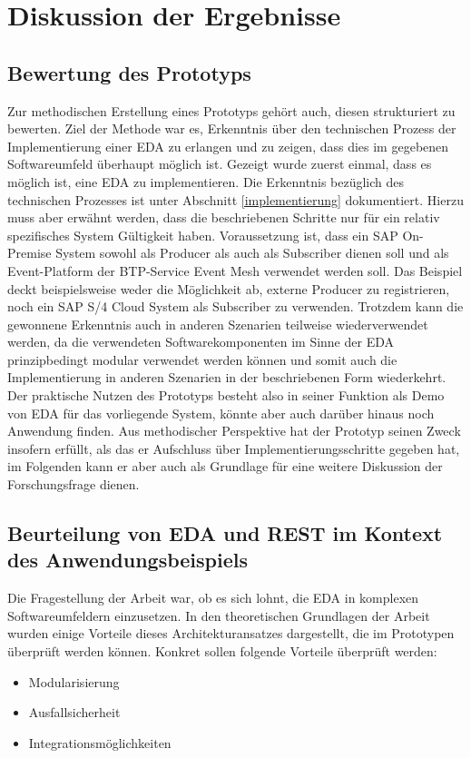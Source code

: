 \section{Diskussion der Ergebnisse}
\subsection{Bewertung des Prototyps}
Zur methodischen Erstellung eines Prototyps gehört auch, diesen strukturiert zu bewerten. Ziel der Methode war es, Erkenntnis über den technischen Prozess der Implementierung einer \ac{EDA} zu erlangen und zu zeigen, dass dies im gegebenen Softwareumfeld überhaupt möglich ist. 
Gezeigt wurde zuerst einmal, dass es möglich ist, eine \ac{EDA} zu implementieren. Die Erkenntnis bezüglich des technischen Prozesses ist unter Abschnitt \ref{implementierung} dokumentiert. Hierzu muss aber erwähnt werden, dass die beschriebenen Schritte nur für ein relativ spezifisches System Gültigkeit haben. Voraussetzung ist, dass ein SAP On-Premise System sowohl als Producer als auch als Subscriber dienen soll und als Event-Platform der \ac{BTP}-Service Event Mesh verwendet werden soll. Das Beispiel deckt beispielsweise weder die Möglichkeit ab, externe Producer zu registrieren, noch ein SAP S/4 Cloud System als Subscriber zu verwenden. 
Trotzdem kann die gewonnene Erkenntnis auch in anderen Szenarien teilweise wiederverwendet werden, da die verwendeten Softwarekomponenten im Sinne der \ac{EDA} prinzipbedingt modular verwendet werden können und somit auch die Implementierung in anderen Szenarien in der beschriebenen Form wiederkehrt.
Der praktische Nutzen des Prototyps besteht also in seiner Funktion als Demo von \ac{EDA} für das vorliegende System, könnte aber auch darüber hinaus noch Anwendung finden. Aus methodischer Perspektive hat der Prototyp seinen Zweck insofern erfüllt, als das er Aufschluss über Implementierungsschritte gegeben hat, im Folgenden kann er aber auch als Grundlage für eine weitere Diskussion der Forschungsfrage dienen.

\subsection{Beurteilung von EDA und REST im Kontext des Anwendungsbeispiels}
Die Fragestellung der Arbeit war, ob es sich lohnt, die \ac{EDA} in komplexen Softwareumfeldern einzusetzen. In den theoretischen Grundlagen der Arbeit wurden einige Vorteile dieses Architekturansatzes dargestellt, die im Prototypen überprüft werden können. Konkret sollen folgende Vorteile überprüft werden:
\begin{itemize}
    \item Modularisierung
    \item Ausfallsicherheit
    \item Integrationsmöglichkeiten
\end{itemize}
